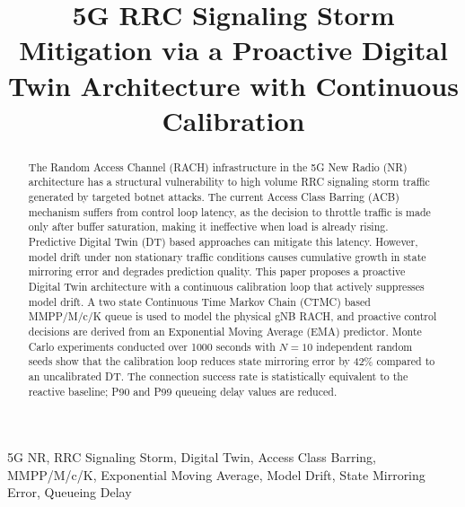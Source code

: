 \documentclass[conference]{IEEEtran}
\begin{document}

\title{5G RRC Signaling Storm Mitigation via a Proactive Digital Twin Architecture with Continuous Calibration}

\author{%
}

\maketitle

\begin{abstract}
The Random Access Channel (RACH) infrastructure in the 5G New Radio (NR) architecture has a structural vulnerability to high volume RRC signaling storm traffic generated by targeted botnet attacks. The current Access Class Barring (ACB) mechanism suffers from control loop latency, as the decision to throttle traffic is made only after buffer saturation, making it ineffective when load is already rising. Predictive Digital Twin (DT) based approaches can mitigate this latency. However, model drift under non stationary traffic conditions causes cumulative growth in state mirroring error and degrades prediction quality. This paper proposes a proactive Digital Twin architecture with a continuous calibration loop that actively suppresses model drift. A two state Continuous Time Markov Chain (CTMC) based MMPP/M/c/K queue is used to model the physical gNB RACH, and proactive control decisions are derived from an Exponential Moving Average (EMA) predictor. Monte Carlo experiments conducted over 1000 seconds with $N=10$ independent random seeds show that the calibration loop reduces state mirroring error by 42\% compared to an uncalibrated DT. The connection success rate is statistically equivalent to the reactive baseline; P90 and P99 queueing delay values are reduced.
\end{abstract}

\begin{IEEEkeywords}
5G NR, RRC Signaling Storm, Digital Twin, Access Class Barring, MMPP/M/c/K, Exponential Moving Average, Model Drift, State Mirroring Error, Queueing Delay
\end{IEEEkeywords}
\end{document}
